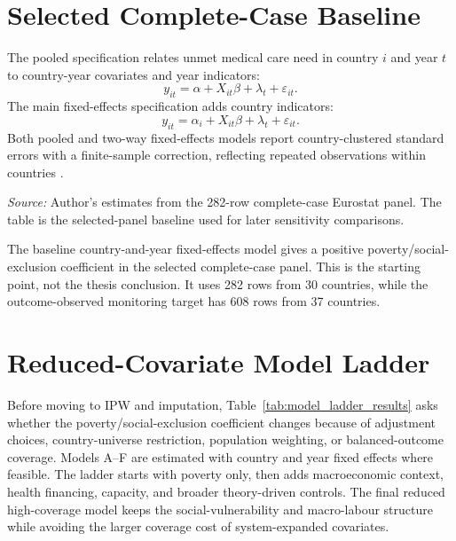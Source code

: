 \FloatBarrier

\section{Selected Complete-Case Baseline}

The pooled specification relates unmet medical care need in country \(i\) and year \(t\) to country-year covariates and year indicators:
\[
y_{it} = \alpha + X_{it}\beta + \lambda_t + \varepsilon_{it}.
\]
The main fixed-effects specification adds country indicators:
\[
y_{it} = \alpha_i + X_{it}\beta + \lambda_t + \varepsilon_{it}.
\]
Both pooled and two-way fixed-effects models report country-clustered standard errors with a finite-sample correction, reflecting repeated observations within countries \citep{arellano_1987,bertrand_duflo_mullainathan_2004}.

\begin{table}[htbp]
\centering
\small
\caption{Baseline regression estimates for unmet medical care need. The FE column is the selected 282-row complete-case country-year sample over 2015--2024 with country and year fixed effects and country-clustered standard errors.}
\label{tab:regression_main_results}

\vspace{0.25em}

\begin{minipage}{0.92\textwidth}
\scriptsize \textit{Source:} Author's estimates from the 282-row complete-case Eurostat panel. The table is the selected-panel baseline used for later sensitivity comparisons.
\end{minipage}
\end{table}

The baseline country-and-year fixed-effects model gives a positive poverty/social-exclusion coefficient in the selected complete-case panel. This is the starting point, not the thesis conclusion. It uses 282 rows from 30 countries, while the outcome-observed monitoring target has 608 rows from 37 countries.

\section{Reduced-Covariate Model Ladder}

Before moving to IPW and imputation, Table~\ref{tab:model_ladder_results} asks whether the poverty/social-exclusion coefficient changes because of adjustment choices, country-universe restriction, population weighting, or balanced-outcome coverage. Models A--F are estimated with country and year fixed effects where feasible. The ladder starts with poverty only, then adds macroeconomic context, health financing, capacity, and broader theory-driven controls. The final reduced high-coverage model keeps the social-vulnerability and macro-labour structure while avoiding the larger coverage cost of system-expanded covariates.

